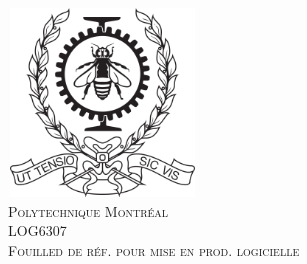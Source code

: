 \begin{titlepage}

\newcommand{\HRule}{\rule{\linewidth}{0.5mm}} %

\center %
 

\newcommand{\corporation}{Polytechnique Montréal}
\newcommand{\majorHeading}{LOG6307}
\newcommand{\minorHeading}{Fouilled de réf. pour mise en prod. logicielle}
\newcommand{\projectTitle}{Quality and Productivity Outcomes Relating to Continuous Integration in GitHub}

\newcommand{\authorFN}{Antoine}
\newcommand{\authorLN}{Gagné}
\newcommand{\matricle}{1440461}



\includegraphics[width=5.0cm,height=5.0cm]{logo_poly.png}\\[2.0cm]


\textsc{\LARGE \corporation}\\ [2.0cm] %
\textsc{\Large \majorHeading}\\[0.5cm] %
\textsc{\large \minorHeading}\\[1.0cm] %



\end{titlepage}
